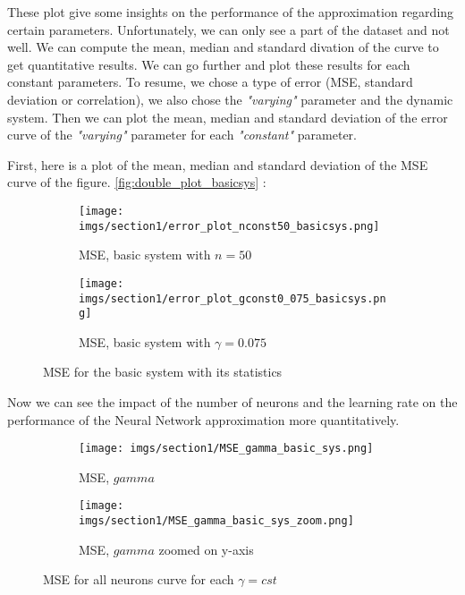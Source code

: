 These plot give some insights on the performance of the approximation regarding certain %
parameters. Unfortunately, we can only see a part of the dataset and not well. %
We can compute the mean, median and standard divation of the curve to get %
quantitative results. We can go further and plot these results for each constant %
parameters. To resume, we chose a type of error (MSE, standard deviation or correlation), %
we also chose the \textit{"varying"} parameter and the dynamic system. Then we can plot %
the mean, median and standard deviation of the error curve of the \textit{"varying"} parameter %
for each \textit{"constant"} parameter. %

First, here is a plot of the mean, median and standard deviation of the MSE curve of %
the figure. \ref{fig:double_plot_basicsys} :

\begin{figure}[htbp]
    \centering
    \begin{subfigure}{0.49\textwidth}
        \centering
        \texttt{[image: imgs/section1/error\_plot\_nconst50\_basicsys.png]}
        \caption{MSE, basic system with \(n = 50\)}
        \label{fig:error_plot_nconst50_basicsys}
    \end{subfigure}
    \hfill
    \begin{subfigure}{0.49\textwidth}
        \centering
        \texttt{[image: imgs/section1/error\_plot\_gconst0\_075\_basicsys.png]}
        \caption{MSE, basic system with \(\gamma = 0.075\)}
        \label{fig:error_plot_gammconst075_basicsys}
    \end{subfigure}
    \caption{MSE for the basic system with its statistics}
    \label{fig:double_error_plot_basicsys}
\end{figure}

Now we can see the impact of the number of neurons and the learning rate on the %
performance of the Neural Network approximation more quantitatively. %

\begin{figure}[htbp]
    \centering
    \begin{subfigure}{0.49\textwidth}
        \centering
        \texttt{[image: imgs/section1/MSE\_gamma\_basic\_sys.png]}
        \caption{MSE, \(gamma\)}
        \label{fig:MSE_gamma}
    \end{subfigure}
    \hfill
    \begin{subfigure}{0.49\textwidth}
        \centering
        \texttt{[image: imgs/section1/MSE\_gamma\_basic\_sys\_zoom.png]}
        \caption{MSE, \(gamma\) zoomed on y-axis}
        \label{fig:MSE_gamma_zoom}
    \end{subfigure}
    \caption{MSE for all neurons curve for each \(\gamma = cst\)}
    \label{fig:double_plot_basicsysMSEGAMMA}
\end{figure}

